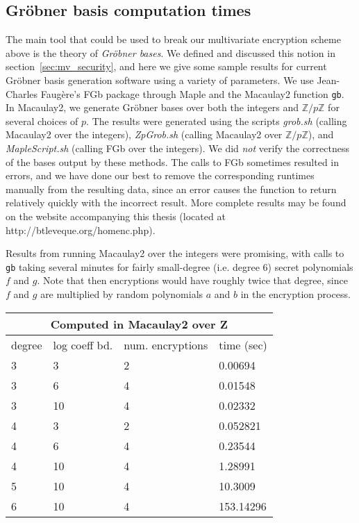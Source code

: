 \documentclass[11pt]{report}
\newcommand{\Zp}{\mathbb{Z}/p\mathbb{Z}}
\begin{document}
\subsection{Gr\"obner basis computation times}
The main tool that could be used to break our multivariate encryption scheme above is the theory of \emph{Gr\"obner bases}. We defined and discussed this notion in section~\ref{sec:mv_security}, and here we give some sample results for current Gr\"obner basis generation software using a variety of parameters. We use Jean-Charles Faug\`ere's FGb package through Maple and the Macaulay2 function \verb|gb|. In Macaulay2, we generate Gr\"obner bases over both the integers and $\Zp$ for several choices of $p$. The results were generated using the scripts \emph{grob.sh} (calling Macaulay2 over the integers), \emph{ZpGrob.sh} (calling Macaulay2 over $\Zp$), and \emph{MapleScript.sh} (calling FGb over the integers). We did \emph{not} verify the correctness of the bases output by these methods. The calls to FGb sometimes resulted in errors, and we have done our best to remove the corresponding runtimes manually from the resulting data, since an error causes the function to return relatively quickly with the incorrect result. More complete results may be found on the website accompanying this thesis (located at http://btleveque.org/homenc.php).

Results from running Macaulay2 over the integers were promising, with calls to \verb|gb| taking several minutes for fairly small-degree (i.e. degree 6) secret polynomials $f$ and $g$. Note that then encryptions would have roughly twice that degree, since $f$ and $g$ are multiplied by random polynomials $a$ and $b$ in the encryption process.

\begin{center}
\begin{tabular}{|l|l|l|l|}
\hline
\multicolumn{4}{|c|}{Computed in Macaulay2 over Z} \\
\hline
degree & log coeff bd. & num. encryptions & time (sec)\\
\hline
3 & 3 & 2 & 0.00694 \\
\hline
3 & 6 & 4 & 0.01548 \\
\hline
3 & 10 & 4 & 0.02332 \\
\hline
4 & 3 & 2 & 0.052821 \\
\hline
4 & 6 & 4 & 0.23544  \\
\hline
4 & 10 & 4 & 1.28991 \\
\hline
5 & 10 & 4 & 10.3009\\
\hline
6 & 10 & 4 & 153.14296 \\
\hline
\end{tabular}
\end{center}
\end{document}
